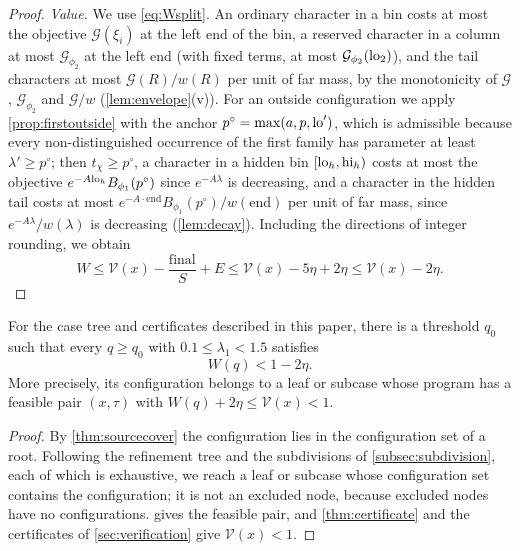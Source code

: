 \begin{proof}
\emph{Value.} We use \eqref{eq:Wsplit}. An ordinary character in a bin costs at most the
objective $\mathcal G(\xi_i)$ at the left end of the bin, a reserved character in a column at most $\mathcal G_{\phi_2}$ at
the left end (with fixed terms, at most $\mathcal G_{\phi_2}(\mathrm{lo}_2)$), and the tail characters at most $\mathcal G(R)/w(R)$ per unit of far mass, by the monotonicity
of $\mathcal G$, $\mathcal G_{\phi_2}$ and $\mathcal G/w$ (\cref{lem:envelope}(v)). For an outside configuration we apply
\cref{prop:firstoutside} with the anchor $p^\circ=\max(a,p,\mathrm{lo}')$, which is admissible because every
non-distinguished occurrence of the first family has parameter at least $\lambda'\ge p^\circ$; then
$t_\chi\ge p^\circ$, a character in a hidden bin $[\mathrm{lo}_h,\mathrm{hi}_h)$ costs at most the objective $e^{-A\mathrm{lo}_h}B_{\phi_1}(p^\circ)$
since $e^{-A\lambda}$ is decreasing, and a character in the hidden tail costs at most
$e^{-A\cdot\mathrm{end}}B_{\phi_1}(p^\circ)/w(\mathrm{end})$ per unit of far mass, since $e^{-A\lambda}/w(\lambda)$ is decreasing
(\cref{lem:decay}). Including the directions of integer rounding, we obtain
\[
  W\le\mathcal V(x)-\frac{\mathrm{final}}S+E
    \le\mathcal V(x)-5\eta+2\eta
    \le\mathcal V(x)-2\eta.
\]
\end{proof}

\begin{theorem}\label{thm:cover}
For the case tree and certificates described in this paper, there is a threshold
$q_0$ such that every $q\ge q_0$ with $0.1\le\lambda_1<1.5$ satisfies
\[
  W(q)<1-2\eta.
\]
More precisely, its configuration belongs to a leaf or subcase whose program has a
feasible pair $(x,\tau)$ with $W(q)+2\eta\le\mathcal V(x)<1$.
\end{theorem}

\begin{proof}
By \cref{thm:sourcecover} the configuration lies in the configuration set of a root. Following the
refinement tree and the subdivisions of \cref{subsec:subdivision}, each of which is exhaustive,
we reach a leaf or subcase whose configuration set contains the configuration; it is not an
excluded node, because excluded nodes have no configurations.  gives the
feasible pair, and \cref{thm:certificate} and the certificates of \cref{sec:verification} give
$\mathcal V(x)<1$.
\end{proof}
